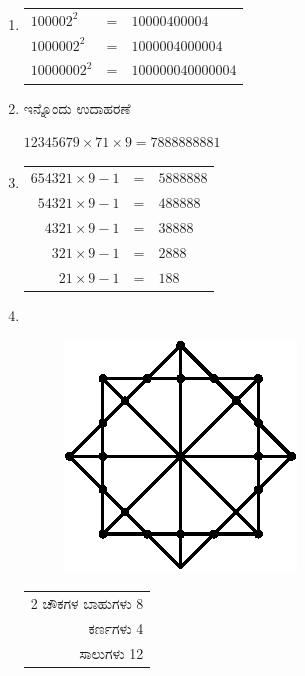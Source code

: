 \begin{enumerate}
\smallskip
\item 

\begin{tabular}[t]{lll}
$100002^{2}$ & = & $10000400004$\\
$1000002^{2}$ & = & $1000004000004$\\
$10000002^{2}$ & = & $100000040000004$\\
\end{tabular}

\item ಇನ್ನೊಂದು ಉದಾಹರಣೆ 

$12345679\times 71\times 9 = 7888888881$

\smallskip
\item 
\begin{tabular}[t]{rcl}
$654321\times 9 - 1$ & = & $5888888$\\
$54321\times 9 - 1$ & = & $488888$\\
$4321\times 9 - 1$ & = & $38888$\\
$321\times 9 - 1$ & = & $2888$\\
$21\times 9 - 1$ & = & $188$
\end{tabular}

\item 
~

\begin{minipage}[c]{4cm}
\begin{figure}[H]
\centering
\includegraphics[scale=1.1]{images/chap9/ans20.eps}
\end{figure}
\end{minipage}
\qquad
\begin{minipage}[c]{5cm}
\begin{tabular}[t]{r}
2 ಚೌಕಗಳ ಬಾಹುಗಳು 8 \\
ಕರ್ಣಗಳು 4\\
\hline
ಸಾಲುಗಳು 12\\
\hline
\end{tabular}


\end{minipage}
\end{enumerate}
